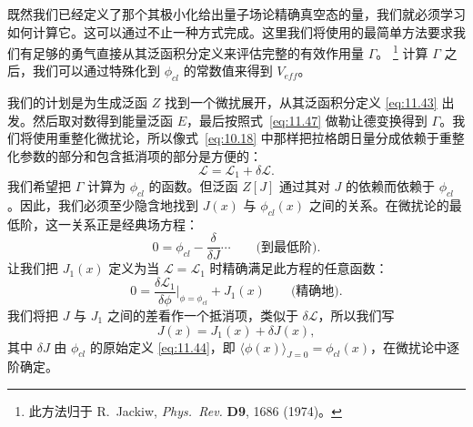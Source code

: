 既然我们已经定义了那个其极小化给出量子场论精确真空态的量，我们就必须学习如何计算它。这可以通过不止一种方式完成。这里我们将使用的最简单方法要求我们有足够的勇气直接从其泛函积分定义来评估完整的有效作用量 $\Gamma$。%
\footnote{此方法归于 R.~Jackiw, \emph{Phys.\ Rev.} \textbf{D9}, 1686 (1974)。}
计算 $\Gamma$ 之后，我们可以通过特殊化到 $\phi_{cl}$ 的常数值来得到 $V_{eff}$。

我们的计划是为生成泛函 $Z$ 找到一个微扰展开，从其泛函积分定义 \eqref{eq:11.43} 出发。然后取对数得到能量泛函 $E$，最后按照式~\eqref{eq:11.47} 做勒让德变换得到 $\Gamma$。我们将使用重整化微扰论，所以像式~\eqref{eq:10.18} 中那样把拉格朗日量分成依赖于重整化参数的部分和包含抵消项的部分是方便的：
\begin{equation}
  \mathcal{L} = \mathcal{L}_1 + \delta\mathcal{L} .
  \label{eq:11.54}
\end{equation}
我们希望把 $\Gamma$ 计算为 $\phi_{cl}$ 的函数。但泛函 $Z[J]$ 通过其对 $J$ 的依赖而依赖于 $\phi_{cl}$。因此，我们必须至少隐含地找到 $J(x)$ 与 $\phi_{cl}(x)$ 之间的关系。在微扰论的最低阶，这一关系正是经典场方程：
\begin{equation}
  0 = \phi_{cl} - \frac{\delta}{\delta J} \cdots
  \qquad\text{(到最低阶)} .
\end{equation}
让我们把 $J_1(x)$ 定义为当 $\mathcal{L} = \mathcal{L}_1$ 时精确满足此方程的任意函数：
\begin{equation}
  0 = \frac{\delta\mathcal{L}_1}{\delta\phi}\Big|_{\phi=\phi_{cl}}
    + J_1(x) \qquad \text{(精确地)} .
  \label{eq:11.55}
\end{equation}
我们将把 $J$ 与 $J_1$ 之间的差看作一个抵消项，类似于 $\delta\mathcal{L}$，所以我们写
\begin{equation}
  J(x) = J_1(x) + \delta J(x) ,
  \label{eq:11.56}
\end{equation}
其中 $\delta J$ 由 $\phi_{cl}$ 的原始定义 \eqref{eq:11.44}，即 $\langle\phi(x)\rangle_{J=0} = \phi_{cl}(x)$，在微扰论中逐阶确定。

